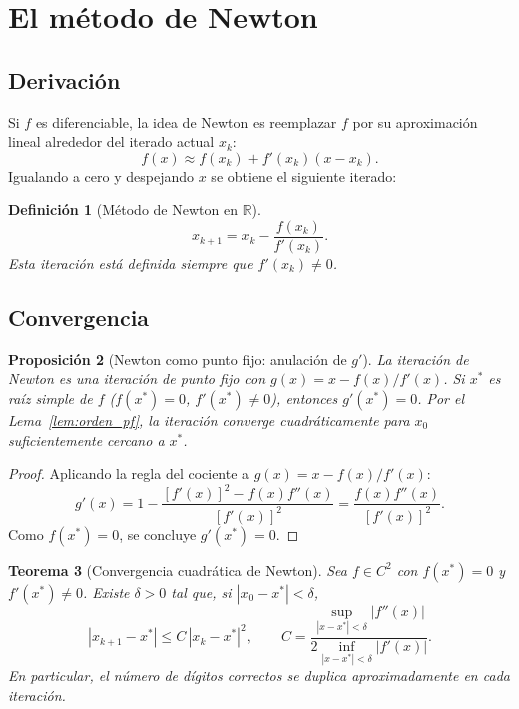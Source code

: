 \documentclass[a4paper,11pt]{report}
\newtheorem{theorem}{Teorema}[chapter]
\newtheorem{definition}[theorem]{Definición}
\newtheorem{proposition}[theorem]{Proposición}
\begin{document}
\section{El método de Newton}
\label{sec:newton_1d}

\subsection{Derivación}

Si $f$ es diferenciable, la idea de Newton es reemplazar $f$ por su
aproximación lineal alrededor del iterado actual $x_k$:
\[
f(x)\approx f(x_k)+f'(x_k)(x-x_k).
\]
Igualando a cero y despejando $x$ se obtiene el siguiente iterado:

\begin{definition}[Método de Newton en $\mathbb{R}$]\label{def:newton_1d}
\[
x_{k+1}=x_k-\frac{f(x_k)}{f'(x_k)}.
\]
Esta iteración está definida siempre que $f'(x_k)\ne 0$.
\end{definition}

\subsection{Convergencia}

\begin{proposition}[Newton como punto fijo: anulación de $g'$]\label{prop:newton_pf}
La iteración de Newton es una iteración de punto fijo con $g(x)=x-f(x)/f'(x)$.
Si $x^*$ es raíz simple de $f$ ($f(x^*)=0$, $f'(x^*)\ne 0$), entonces $g'(x^*)=0$.
Por el Lema~\ref{lem:orden_pf}, la iteración converge cuadráticamente
para $x_0$ suficientemente cercano a $x^*$.
\end{proposition}

\begin{proof}
Aplicando la regla del cociente a $g(x)=x-f(x)/f'(x)$:
\[
g'(x)=1-\frac{[f'(x)]^2-f(x)f''(x)}{[f'(x)]^2}=\frac{f(x)f''(x)}{[f'(x)]^2}.
\]
Como $f(x^*)=0$, se concluye $g'(x^*)=0$.
\end{proof}

\begin{theorem}[Convergencia cuadrática de Newton]\label{thm:newton_1d_conv}
Sea $f\in C^2$ con $f(x^*)=0$ y $f'(x^*)\ne 0$.
Existe $\delta>0$ tal que, si $|x_0-x^*|<\delta$,
\[
|x_{k+1}-x^*|\le C\,|x_k-x^*|^2,\qquad
C=\frac{\sup_{|x-x^*|<\delta}|f''(x)|}{2\inf_{|x-x^*|<\delta}|f'(x)|}.
\]
En particular, el número de dígitos correctos se duplica aproximadamente en cada iteración.
\end{theorem}
\end{document}
